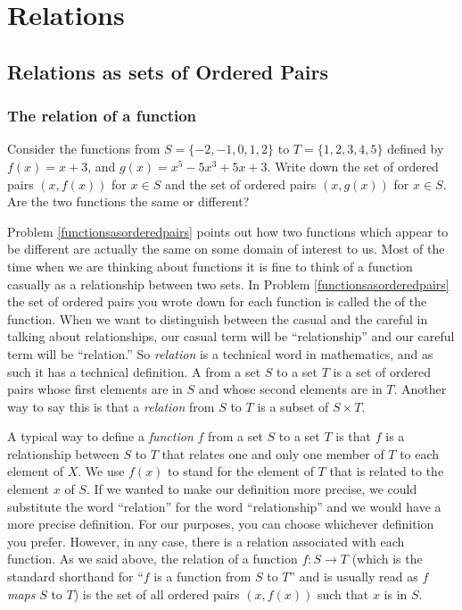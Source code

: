 \appendix 
\chapter{Relations}
\label{Relations}

\section{Relations as sets of Ordered Pairs}
\subsection{The relation of a function}\label{functionrelation}
\label{relationsandfunctions}
\bp

\item Consider the functions from $S=\{-2,-1,0,1,2\}$ to
$T=\{1,2,3,4,5\}$ defined by
$f(x) = x+3$, and $g(x) = x^5-5x^3+5x +3$.  Write down the set
of ordered pairs $(x,f(x))$ for $x \in S$  and the set of
ordered pairs
$(x,g(x))$ for $x \in S$.  Are the two functions the same or
different?
\label{functionsasorderedpairs}

\ep

Problem
\ref{functionsasorderedpairs} points out how two functions
which appear to be different are actually the same on some
domain of interest to us.   Most of the time when we are
thinking about functions it is fine to think of a function
casually as a relationship between two sets.  In Problem
\ref{functionsasorderedpairs} the set of ordered pairs you
wrote down for each function is called the  of the function. 
When we want to distinguish between the casual and the careful in
talking about relationships, our casual term will be ``relationship''
and our careful term will be ``relation.''  So {\em relation}
 is a technical word in mathematics, and as such it has
a technical definition.  A  from a set
$S$ to a set $T$ is a set of ordered pairs whose first elements are in
$S$ and whose second elements are in $T$.  Another way to say this is
that a {\em relation} from $S$ to $T$ is a subset of $S\times T$.

A typical way to define a {\em function} $f$ from a
set
$S$ to a set
$T$ is that $f$ is a relationship between $S$ to $T$ that relates
one and only one member of $T$ to each element of $X$. We use
$f(x)$ to stand for the element of $T$ that is related to the
element $x$ of $S$.  If we wanted to make our definition more
precise, we could substitute the word ``relation'' for the word
``relationship'' and we would have a more precise definition.  For
our purposes, you can choose whichever definition you prefer. 
However, in any case, there is a relation associated with each
function.  As we said above, the relation of a function $f:
S\rightarrow T$ (which is the standard shorthand for ``$f$ is a
function from $S$ to $T$'' and is usually read as $f$ {\em maps}
$S$ to $T$) is the set of all ordered pairs
$(x,f(x))$ such that $x$ is in $S$.  


